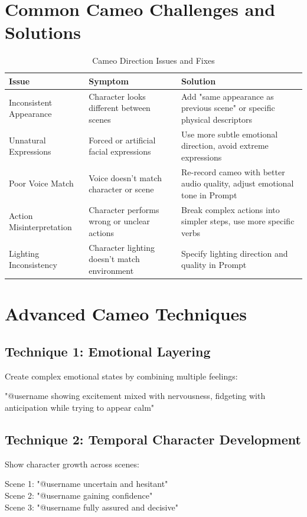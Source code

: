 \section*{Common Cameo Challenges and Solutions}

\begin{table}[H]
\centering
\caption{Cameo Direction Issues and Fixes \\ \authorillustration}
\label{tab:cameo-issues}
\begin{tabular}{p{4cm}p{4cm}p{5cm}}
\hline
\textbf{Issue} & \textbf{Symptom} & \textbf{Solution} \\
\hline
Inconsistent Appearance & Character looks different between scenes & Add "same appearance as previous scene" or specific physical descriptors \\
\hline
Unnatural Expressions & Forced or artificial facial expressions & Use more subtle emotional direction, avoid extreme expressions \\
\hline
Poor Voice Match & Voice doesn't match character or scene & Re-record cameo with better audio quality, adjust emotional tone in Prompt \\
\hline
Action Misinterpretation & Character performs wrong or unclear actions & Break complex actions into simpler steps, use more specific verbs \\
\hline
Lighting Inconsistency & Character lighting doesn't match environment & Specify lighting direction and quality in Prompt \\
\hline
\end{tabular}
\end{table}

\section*{Advanced Cameo Techniques}

\subsection*{Technique 1: Emotional Layering}
Create complex emotional states by combining multiple feelings:
\begin{Prompt}
"@username showing excitement mixed with nervousness, fidgeting with anticipation while trying to appear calm"
\end{Prompt}

\subsection*{Technique 2: Temporal Character Development}
Show character growth across scenes:
\begin{Prompt}
Scene 1: "@username uncertain and hesitant"\\
Scene 2: "@username gaining confidence"\\
Scene 3: "@username fully assured and decisive"
\end{Prompt}

